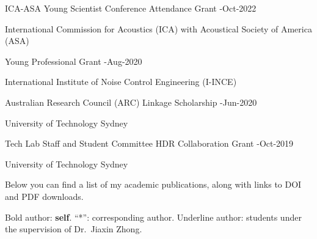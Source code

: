 \documentclass[10pt,a4paper,ragged2e,withhyper]{altacv}
\begin{document}
\begin{paracol}{1}










{\color{accent}ICA-ASA Young Scientist Conference Attendance Grant} 
\hfill {}-Oct-2022
\par
International Commission for
Acoustics (ICA) with Acoustical Society of America (ASA)

\divider

{\color{accent}Young Professional Grant}
\hfill {}-Aug-2020
\par
International Institute of Noise Control Engineering (I-INCE)

\divider

{\color{accent}Australian Research Council (ARC) Linkage Scholarship}
\hfill {}-Jun-2020
\par
University of Technology Sydney

\divider

{\color{accent}Tech Lab Staff and Student Committee HDR Collaboration Grant}
\hfill {}-Oct-2019
\par
University of Technology Sydney


\newpage
{}

Below you can find a list of my academic publications, along with links to {\color{accent}\aiDoi} DOI and {\color{accent}\faFilePdf[regular]} PDF downloads.

Bold author: \textbf{self}.
``*'': corresponding author.
Underline author: students under the supervision of Dr.\ Jiaxin Zhong.


\end{paracol}
\end{document}
